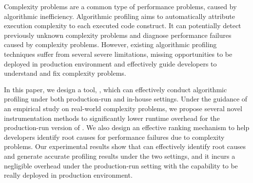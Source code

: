 Complexity problems are a common type of performance problems, 
caused by algorithmic inefficiency. 
Algorithmic profiling aims to automatically attribute execution 
complexity to each executed code construct.
It can potentially detect previously unknown complexity problems 
and diagnose performance failures caused by complexity problems. 
However, existing algorithmic profiling techniques 
suffer from several severe limitations, 
missing opportunities to be deployed in production environment
and effectively guide developers 
to understand and fix complexity problems. 

In this paper, we design a tool, \Tool, which can effectively conduct 
algorithmic profiling under both production-run and in-house settings.
Under the guidance of an empirical study on real-world complexity problems, 
we propose several novel instrumentation methods to 
significantly lower runtime overhead
for the production-run version of \Tool.
We also design an effective ranking mechanism to help developers identify 
root causes for performance failures due to complexity problems. 
Our experimental results show that \Tool 
can effectively identify root causes and generate 
accurate profiling results under the two settings, 
and it incurs a negligible overhead under the production-run setting
with the capability to be really deployed in production environment. 






